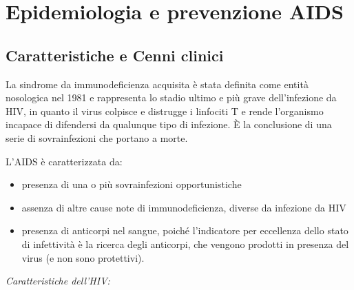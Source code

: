 \section{Epidemiologia e prevenzione AIDS}

\subsection{Caratteristiche e Cenni clinici}

La sindrome da immunodeficienza acquisita è stata definita come entità
nosologica nel 1981 e rappresenta lo stadio ultimo e più grave
dell'infezione da HIV, in quanto il virus colpisce e distrugge i
linfociti T e rende l'organismo incapace di difendersi da qualunque tipo
di infezione. È la conclusione di una serie di sovrainfezioni che
portano a morte.

L'AIDS è caratterizzata da:

\begin{itemize}
\item
  presenza di una o più sovrainfezioni opportunistiche
\item
  assenza di altre cause note di immunodeficienza, diverse da infezione
  da HIV
\item
  presenza di anticorpi nel sangue, poiché l'indicatore per eccellenza
  dello stato di infettività è la ricerca degli anticorpi, che vengono
  prodotti in presenza del virus (e non sono protettivi).
\end{itemize}

\emph{Caratteristiche dell'HIV:}

